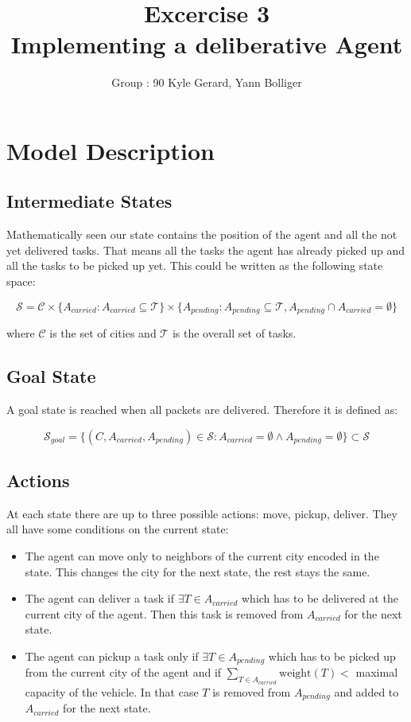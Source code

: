 \documentclass[11pt]{article}
\title{\bf Excercise 3\\ Implementing a deliberative Agent}
\author{Group \textnumero : 90  Kyle Gerard, Yann Bolliger}
\begin{document}
\maketitle

\section{Model Description}

\subsection{Intermediate States}
Mathematically seen our state contains the position of the agent and all the not yet
delivered tasks. That means all the tasks the agent has already picked up
and all the tasks to be picked up yet. This could be written as the following state space:

$$
\mathcal{S} = \mathcal{C} 
\times
\{ A_{carried} : A_{carried} \subseteq \mathcal{T} \}
\times
\{ A_{pending} : A_{pending} \subseteq \mathcal{T} , 
  A_{pending}  \cap A_{carried}  = \emptyset
  \}
$$

where $\mathcal{C} $ is the set of cities and $ \mathcal{T}$ is the overall set 
of tasks. 

\subsection{Goal State}
A goal state is reached when all packets are delivered. Therefore it is 
defined as:

$$
\mathcal{S}_{goal} =  \{  (C, A_{carried}, A_{pending}) \in  \mathcal{S} : 
A_{carried} = \emptyset \wedge A_{pending} = \emptyset \} \subset  \mathcal{S}
$$

\subsection{Actions}
At each state there are up to three possible actions: move, pickup, deliver. 
They all have some conditions on the current state:

\begin{itemize}
  \item
  The agent can move only to neighbors of the current city encoded in the state. 
  This changes the city for the next state, the rest stays the same.
  
    \item
  The agent can deliver a task if $ \exists T \in A_{carried}$ which has 
  to be delivered at the current city of the agent.
  Then this task is removed from $A_{carried}$ for the next state.
  
  \item
  The agent can pickup a task only if $\exists T \in A_{pending} $ which has to 
  be picked up from the current city of the agent and if 
  $\sum_{T \in A_{carried} } \text{weight} (T) < $ maximal capacity of the 
  vehicle.
  In that case $T$ is removed from  $A_{pending}$  and added to $A_{carried}$ 
  for the next state.
\end{itemize}
\end{document}
